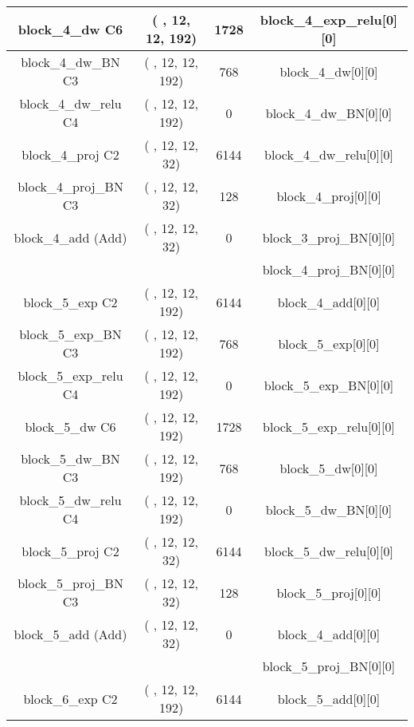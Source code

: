 \documentclass{bmvc2k}
\begin{document}
\begin{table}
\centering
\begin{tabular}{|c|c|c|c|}

block\_4\_dw C6 & ( , 12, 12, 192)&  1728   &     block\_4\_exp\_relu[0][0]        \\ \hline
block\_4\_dw\_BN C3 & ( , 12, 12, 192)&  768    &     block\_4\_dw[0][0]          \\ \hline
block\_4\_dw\_relu C4   & ( , 12, 12, 192)&  0      &     block\_4\_dw\_BN[0][0]       \\ \hline
block\_4\_proj C2        & ( , 12, 12, 32) &  6144   &     block\_4\_dw\_relu[0][0]     \\ \hline
block\_4\_proj\_BN C3 & ( , 12, 12, 32) &  128    &     block\_4\_proj[0][0]            \\ \hline
block\_4\_add (Add)               & ( , 12, 12, 32) &  0      &     block\_3\_proj\_BN[0][0]         \\ 
                                &                    &         &      block\_4\_proj\_BN[0][0]         \\ \hline
block\_5\_exp C2         & ( , 12, 12, 192)&  6144   &     block\_4\_add[0][0]                \\ \hline
block\_5\_exp\_BN C3 & ( , 12, 12, 192)&  768    &     block\_5\_exp[0][0]             \\ \hline
block\_5\_exp\_relu C4      & ( , 12, 12, 192)&  0      &     block\_5\_exp\_BN[0][0]          \\ \hline
block\_5\_dw C6 & ( , 12, 12, 192)&  1728   &     block\_5\_exp\_relu[0][0]        \\ \hline
block\_5\_dw\_BN C3 & ( , 12, 12, 192)&  768    &     block\_5\_dw[0][0]          \\ \hline
block\_5\_dw\_relu C4   & ( , 12, 12, 192)&  0      &     block\_5\_dw\_BN[0][0]       \\ \hline
block\_5\_proj C2        & ( , 12, 12, 32) &  6144   &     block\_5\_dw\_relu[0][0]     \\ \hline
block\_5\_proj\_BN C3 & ( , 12, 12, 32) &  128    &     block\_5\_proj[0][0]            \\ \hline
block\_5\_add (Add)               & ( , 12, 12, 32) &  0      &     block\_4\_add[0][0]                \\ 
                                &                    &         &      block\_5\_proj\_BN[0][0]        \\ \hline
block\_6\_exp C2         & ( , 12, 12, 192)&  6144   &     block\_5\_add[0][0]                \\ \hline

\end{tabular}
\end{table}
\end{document}

